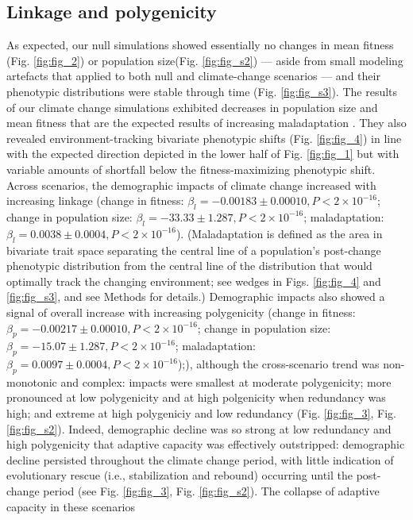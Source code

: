 \documentclass[9pt,twocolumn,twoside,lineno]{pnas-new}
\begin{document}
\subsection{Linkage and polygenicity}
As expected, our null simulations showed essentially no changes
in mean fitness (Fig. \ref{fig:fig_2}) or population size(Fig. \ref{fig:fig_s2})
--- aside from small modeling artefacts that applied to both
null and climate-change scenarios --- and their phenotypic distributions were
stable through time (Fig. \ref{fig:fig_s3}).
The results of our climate change simulations exhibited
decreases in population size and mean fitness
that are the expected results of increasing maladaptation \cite{aitken_whitlock}.
They also revealed environment-tracking bivariate phenotypic shifts (Fig. \ref{fig:fig_4})
in line with the expected direction depicted in the lower half of Fig. \ref{fig:fig_1}
but with variable amounts of shortfall below the fitness-maximizing phenotypic shift.
Across scenarios, the demographic impacts of
climate change increased with increasing linkage
(change in fitness: $\beta_{l} = -0.00183\pm0.00010, P<2\times10^{-16}$;
change in population size: $\beta_{l} = -33.33\pm1.287, P<2\times10^{-16}$;
maladaptation: $\beta_{l} = 0.0038\pm0.0004, P<2\times10^{-16}$).
(Maladaptation is defined as the area in bivariate trait space separating the central line
of a population's post-change phenotypic distribution from the central line of the distribution
that would optimally track the changing environment; see wedges in Figs. \ref{fig:fig_4} and \ref{fig:fig_s3}, and see Methods for details.)
Demographic impacts also showed a signal of overall increase with increasing polygenicity
(change in fitness: $\beta_{p} = -0.00217\pm0.00010, P<2\times10^{-16}$;
change in population size: $\beta_{p} = -15.07\pm1.287, P<2\times10^{-16}$;
maladaptation: $\beta_{p} = 0.0097\pm0.0004, P<2\times10^{-16}$);),
although the cross-scenario trend was non-monotonic and complex: impacts were smallest at moderate polygenicity;
more pronounced at low polygenicity and at high polgenicity when redundancy was high;
and extreme at high polygeniciy and low redundancy (Fig. \ref{fig:fig_3}, Fig. \ref{fig:fig_s2}).
Indeed, demographic decline was so strong at low redundancy and high polygenicity
that adaptive capacity was effectively outstripped: demographic decline persisted throughout
the climate change period, with little indication of evolutionary rescue
(i.e., stabilization and rebound) occurring until the post-change period (see Fig. \ref{fig:fig_3}, Fig. \ref{fig:fig_s2}).
The collapse of adaptive capacity in these scenarios
\end{document}
